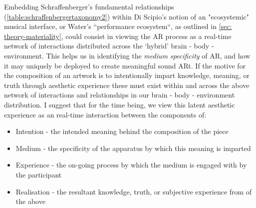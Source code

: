 Embedding Schraffenberger's fundamental relationships (\autoref{table:schraffenbergertaxonomy2}) within Di Scipio's notion of an "ecosystemic" musical interface, or Water's ``performance ecosystem``, as outlined in \autoref{sec: theory-materiality}, could consist in viewing the AR process as a real-time network of interactions distributed across the `hybrid' brain - body - environment. This helps us in identifying the \textit{medium specificity} of AR, and how it may uniquely be deployed to create meaningful sound ARt. If the motive for the composition of an artwork is to intentionally impart knowledge, meaning, or truth through aesthetic experience these must exist within and across the above network of interactions and relationships in our brain - body - environment distribution. I suggest that for the time being, we view this latent aesthetic experience as an real-time interaction between the components of:
\begin{itemize}
    \item Intention - the intended meaning behind the composition of the piece
    \item Medium - the specificity of the apparatus by which this meaning is imparted
    \item Experience - the on-going process by which the medium is engaged with by the participant
    \item Realisation - the resultant knowledge, truth, or subjective experience from of the above
\end{itemize}

